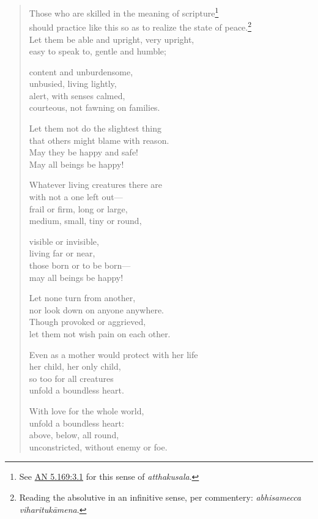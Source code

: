 \documentclass[12pt,openany]{book}%
\begin{document}
\begin{verse}%
Those who are skilled in the meaning of scripture\footnote{See \href{https://suttacentral.net/an5.169/en/sujato\#3.1}{AN 5.169:3.1} for this sense of \textit{atthakusala}. } \\
should practice like this so as to realize the state of peace.\footnote{Reading the absolutive in an infinitive sense, per commentery: \textit{abhisamecca \textsanskrit{viharitukāmena}}. } \\
Let them be able and upright, very upright, \\
easy to speak to, gentle and humble; 

content and unburdensome, \\
unbusied, living lightly, \\
alert, with senses calmed, \\
courteous, not fawning on families. 

Let them not do the slightest thing \\
that others might blame with reason. \\
May they be happy and safe! \\
May all beings be happy! 

Whatever living creatures there are \\
with not a one left out—\\
frail or firm, long or large, \\
medium, small, tiny or round, 

visible or invisible, \\
living far or near, \\
those born or to be born—\\
may all beings be happy! 

Let none turn from another, \\
nor look down on anyone anywhere. \\
Though provoked or aggrieved, \\
let them not wish pain on each other. 

Even as a mother would protect with her life \\
her child, her only child, \\
so too for all creatures \\
unfold a boundless heart. 

With love for the whole world, \\
unfold a boundless heart: \\
above, below, all round, \\
unconstricted, without enemy or foe. 


\end{verse}
\end{document}
